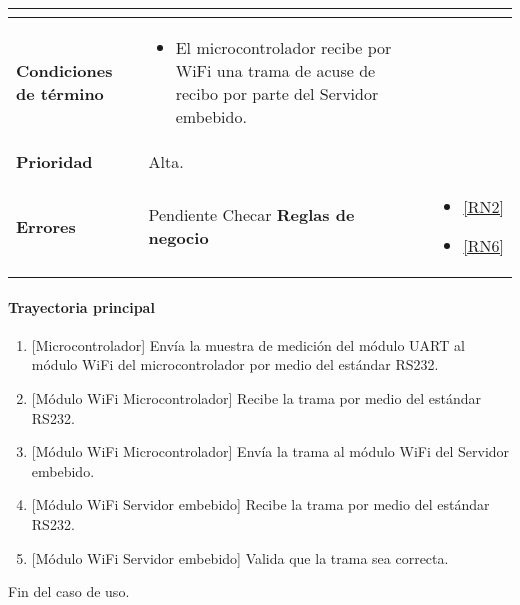 \begin{longtable}{|J{5cm}|J{10.3cm}|}
\begin{itemize}
		\end{itemize} \\ \hline
	\textbf{Condiciones de término} & 
		\begin{itemize}
		    \item El microcontrolador recibe por WiFi una trama de acuse de recibo por parte del Servidor embebido.
		\end{itemize} 
		\\ \hline 
	\textbf{Prioridad} & 
		Alta. \\ \hline
	\textbf{Errores} & Pendiente Checar
	\textbf{Reglas de negocio} & 
	    \begin{itemize}
	      \item  \ref{RN2}
	      \item  \ref{RN6}
		 \end{itemize}%
\end{longtable}

\paragraph{Trayectoria principal}
\label{SUB-M-CU1.4:TP}
	\begin{enumerate}
	    \item {[Microcontrolador]} Envía la muestra de medición del módulo UART al módulo WiFi del microcontrolador por medio del estándar RS232.
	    \item {[Módulo WiFi Microcontrolador]} Recibe la trama por medio del estándar RS232.
	    \item {[Módulo WiFi Microcontrolador]} Envía la trama al módulo WiFi del Servidor embebido.
	    \item {[Módulo WiFi Servidor embebido]} Recibe la trama por medio del estándar RS232.
	    \item {[Módulo WiFi Servidor embebido]} Valida que la trama sea correcta. %
	\end{enumerate}
	Fin del caso de uso.

